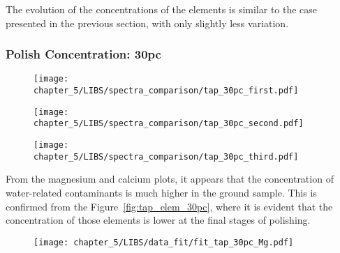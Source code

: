  The evolution of the concentrations of the elements is similar to the case presented in the previous section, with only slightly less variation.









 \subsubsection{Polish Concentration: 30pc}
 \label{subsubsec:30pc}
 \vspace*{-25pt}
 \begin{figure}[H]
     \centering
     \texttt{[image: chapter\_5/LIBS/spectra\_comparison/tap\_30pc\_first.pdf]} 
  \end{figure}
 
 \vspace*{-68pt}
 \begin{figure}[H]
     \centering
     \texttt{[image: chapter\_5/LIBS/spectra\_comparison/tap\_30pc\_second.pdf]} 
  \end{figure}
 
 \vspace*{-68pt}
 \begin{figure}[H]
     \centering
     \texttt{[image: chapter\_5/LIBS/spectra\_comparison/tap\_30pc\_third.pdf]} 
  \end{figure}
 
From the magnesium and calcium plots, it appears that the concentration of water-related contaminants is much higher in the ground sample. This is confirmed from the Figure~\ref{fig:tap_elem_30pc}, where it is evident that the concentration of those elements is lower at the final stages of polishing.

 \begin{figure}[H]
     \centering
     \texttt{[image: chapter\_5/LIBS/data\_fit/fit\_tap\_30pc\_Mg.pdf]} 
  \end{figure}
 
